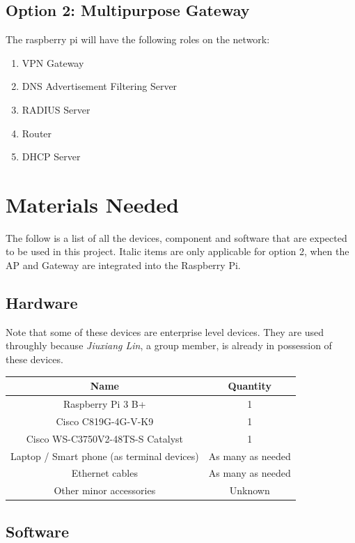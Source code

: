 \documentclass[12pt]{article}
\begin{document}
\subsection{Option 2: Multipurpose Gateway}

The raspberry pi will have the following roles on the network:

\begin{enumerate}
\item VPN Gateway
\item DNS Advertisement Filtering Server
\item RADIUS Server
\item Router
\item DHCP Server
\end{enumerate}

\section{Materials Needed}

The follow is a list of all the devices, component and software that are expected to be used in this project. Italic items are only applicable for option 2, when the AP and Gateway are integrated into the Raspberry Pi.

\subsection{Hardware}

Note that some of these devices are enterprise level devices. They are used throughly because \textit{Jiuxiang Lin}, a group member, is already in possession of these devices.\\

\begin{tabular}{| c | c |}
\hline
\textbf{Name} & \textbf{Quantity} \\\hline
Raspberry Pi 3 B+ & 1 \\\hline
Cisco C819G-4G-V-K9 & 1 \\\hline
Cisco WS-C3750V2-48TS-S Catalyst & 1 \\\hline
Laptop / Smart phone (as terminal devices) & As many as needed \\\hline
Ethernet cables & As many as needed \\\hline
Other minor accessories & Unknown \\\hline
\end{tabular}

\subsection{Software}
\end{document}
